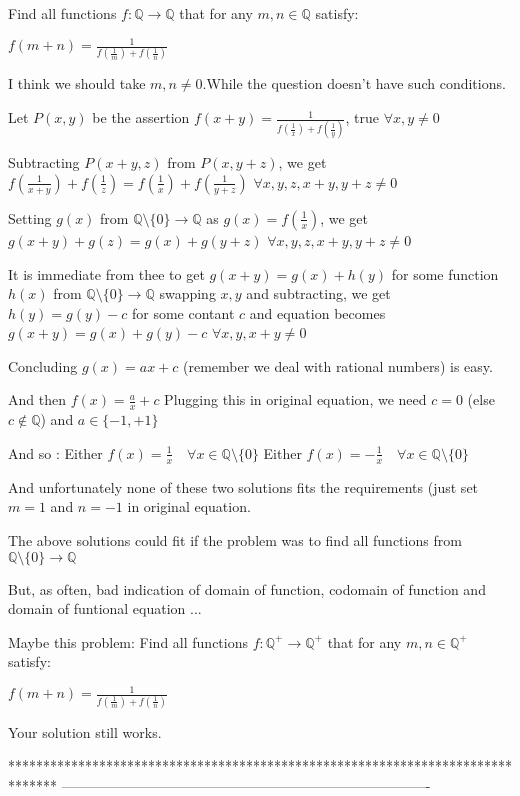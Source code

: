 \begin{solution}
	\begin{tcolorbox}Find all functions $f:\mathbb{Q} \to \mathbb{Q}$ that for any $m,n \in \mathbb{Q}$ satisfy:

$f(m+n)=\frac{1}{f(\frac{1}{m})+f(\frac{1}{n})}$

I think we should take $m,n \neq 0$.While the question doesn't have such conditions.\end{tcolorbox}
Let $P(x,y)$ be the assertion $f(x+y)=\frac 1{f(\frac 1x)+f(\frac 1y)}$, true $\forall x,y\ne 0$

Subtracting $P(x+y,z)$ from $P(x,y+z)$, we get
$f(\frac 1{x+y})+f(\frac 1z)=f(\frac 1x)+f(\frac 1{y+z})$ $\forall x,y,z,x+y,y+z\ne 0$

Setting $g(x)$ from $\mathbb Q\setminus\{0\}\to\mathbb Q$ as $g(x)=f(\frac 1x)$, we get
$g(x+y)+g(z)=g(x)+g(y+z)$ $\forall x,y,z,x+y,y+z\ne 0$

It is immediate from thee to get $g(x+y)=g(x)+h(y)$ for some function $h(x)$ from $\mathbb Q\setminus\{0\}\to\mathbb Q$
swapping $x,y$ and subtracting, we get $h(y)=g(y)-c$ for some contant $c$ and equation becomes
$g(x+y)=g(x)+g(y)-c$ $\forall x,y,x+y\ne 0$

Concluding $g(x)=ax+c$ (remember we deal with rational numbers) is easy.

And then $f(x)=\frac ax+c$
Plugging this in original equation, we need $c=0$ (else $c\notin\mathbb Q$) and $a\in\{-1,+1\}$

And so :
Either $\boxed{f(x)=\frac 1x\quad\forall x\in\mathbb Q\setminus\{0\}}$ 
Either $\boxed{f(x)=-\frac 1x\quad\forall x\in\mathbb Q\setminus\{0\}}$

And unfortunately none of these two solutions fits the requirements (just set $m=1$ and $n=-1$ in original equation.

The above solutions could fit if the problem was to find all functions from $\mathbb Q\setminus\{0\}\to\mathbb Q$

But, as often, bad indication of domain of function, codomain of function and domain of funtional equation ...


\end{solution}



\begin{solution}
	Maybe this problem:
Find all functions $f:\mathbb{Q^+} \to \mathbb{Q^+}$ that for any $m,n \in \mathbb{Q^+}$ satisfy:

$f(m+n)=\frac{1}{f(\frac{1}{m})+f(\frac{1}{n})}$

Your solution still works.
\end{solution}
*******************************************************************************
-------------------------------------------------------------------------------


